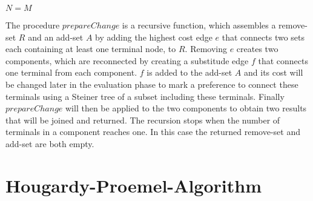 \begin{algorithm}[h!]
$N=M$\;
\label{fig:constructionPseudo}
\end{algorithm}

The procedure $prepareChange$ is a recursive function, which assembles a remove-set $R$ and an add-set $A$ by adding the highest cost edge $e$ that connects two sets each containing at least one terminal node, to $R$. Removing $e$ creates two components, which are reconnected by creating a substitude edge $f$ that connects one terminal from each component. $f$ is added to the add-set $A$ and its cost will be changed later in the evaluation phase to mark a preference to connect these terminals using a Steiner tree of a subset including these terminals. Finally $prepareChange$ will then be applied to the two components to obtain two results that will be joined and returned. The recursion stops when the number of terminals in a component reaches one. In this case the returned remove-set and add-set are both empty.


\begin{algorithm}[ht!]
\label{fig:prepareChangePseudo}
\end{algorithm}

\section{Hougardy-Proemel-Algorithm}

